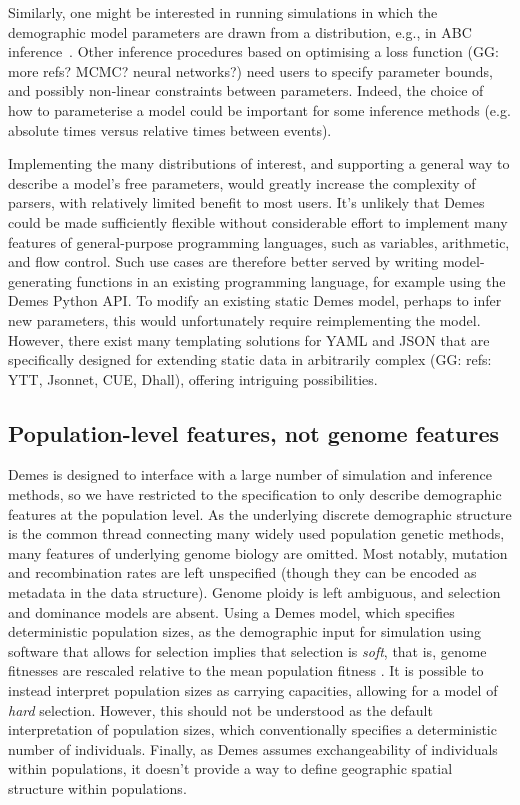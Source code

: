 \documentclass[11pt]{article}
\newcommand{\ggcomment}[1]{{\textcolor{yellow!60!red}{GG: #1}}}
\begin{document}
Similarly, one might be interested in running simulations in which
the demographic model parameters are drawn from a distribution, e.g.,
in ABC inference~\citep{beaumont2002approximate}.
Other inference procedures based on optimising a loss function
\citep{gutenkunst2009inferring,kamm2017efficient,jouganous2017inferring}
(\ggcomment{more refs? MCMC? neural networks?})
need users to specify parameter bounds,
and possibly non-linear constraints between parameters.
Indeed, the choice of how to parameterise a model could be important for
some inference methods (e.g. absolute times versus relative times between events).

Implementing the many distributions of interest, and supporting a general
way to describe a model's free parameters, would greatly increase the
complexity of parsers, with relatively limited benefit to most users.
It's unlikely that Demes could be made sufficiently
flexible without considerable effort to implement many features of
general-purpose programming languages, such as variables, arithmetic,
and flow control.
Such use cases are therefore better served by writing model-generating
functions in an existing programming language, for example
using the Demes Python API.
To modify an existing static Demes model, perhaps to infer new parameters,
this would unfortunately require reimplementing the model.
However, there exist many templating solutions for YAML and JSON that are
specifically designed for extending static data in arbitrarily complex
(\ggcomment{refs: YTT, Jsonnet, CUE, Dhall}),
offering intriguing possibilities.


\subsection{Population-level features, not genome features}
\label{sec:appendix-features}

Demes is designed to interface with a large number of simulation and inference
methods, so we have restricted to the specification to only describe
demographic features at the population level. As the underlying discrete
demographic structure is the common thread connecting many widely used
population genetic methods, many features of underlying genome biology are
omitted. Most notably, mutation and recombination rates are left unspecified
(though they can be encoded as metadata in the data structure). Genome ploidy
is left ambiguous, and selection and dominance models are absent. Using a Demes
model, which specifies deterministic population sizes, as the demographic input
for simulation using software that allows for selection implies that selection
is \emph{soft}, that is, genome fitnesses are rescaled relative to the mean
population fitness \citep{christiansen1975hard}. It is possible to instead
interpret population sizes as carrying capacities, allowing for a model of
\emph{hard} selection. However, this should not be understood as the default
interpretation of population sizes, which conventionally specifies a
deterministic number of individuals. Finally, as Demes assumes exchangeability
of individuals within populations, it doesn't provide a way to define geographic
spatial structure within populations.
\end{document}
